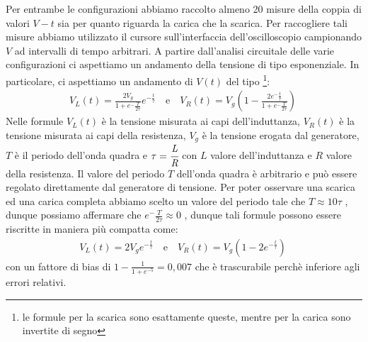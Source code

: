 \documentclass[a4paper]{article}
\begin{document}
Per entrambe le configurazioni abbiamo raccolto almeno 20 misure della coppia di valori \( \mathit{V-t} \) sia per quanto riguarda la carica che la scarica. Per raccogliere tali misure abbiamo utilizzato il cursore sull'interfaccia dell'oscilloscopio campionando \( \mathit{V} \) ad intervalli di tempo arbitrari.
A partire dall'analisi circuitale delle varie configurazioni ci aspettiamo un andamento della tensione di tipo esponenziale. In particolare, ci aspettiamo un andamento di  \( \mathit{V(t)} \) del tipo \footnote{le formule per la scarica sono esattamente queste, mentre per la carica sono invertite di segno}:
\begin{align}
	 & V_L(t) = \frac{2V_g}{1+e^-\frac{T}{\mathit{2\tau}}}e^{-\frac{t}{\mathit{\tau}}}  \quad \text{e} \quad V_R(t) = V_g\left(1-\frac{2e^-\frac{t}{\mathit{\tau}}}{1+e^-\frac{T}{\mathit{2\tau}}}\right)\quad \label{eq:rl_full} %
\end{align}
Nelle formule \( \mathit{V_L(t)} \) è la tensione misurata ai capi dell'induttanza, \( \mathit{V_R(t)} \)  è la tensione misurata ai capi della resistenza, \( \mathit{V_g} \) è la tensione erogata dal generatore, \( \mathit{T} \)  è il periodo dell'onda quadra e \( \mathit{\tau=\cfrac{L}{R}} \)  con \( \mathit{L} \) valore dell'induttanza e \( \mathit{R} \) valore della resistenza. Il valore del periodo \( \mathit{T} \) dell'onda quadra è arbitrario e può essere regolato direttamente dal generatore di tensione. Per poter osservare una scarica ed una carica completa abbiamo scelto un valore del periodo tale che \( \mathit{T\approx10\mathit{\tau}} \) , dunque possiamo affermare che \( \mathit{e^-\frac{T}{2\tau}}\approx 0 \) , dunque tali formule possono essere riscritte in maniera più compatta come: \begin{align}
	 & V_L(t) = 2V_ge^{-\frac{t}{\mathit{\tau}}}  \quad \text{e} \quad V_R(t) = V_g(1-2e^{-\frac{t}{\mathit{\tau}}})\quad \label{eq:rl_approx} %
\end{align}
con un fattore di bias di  $1-\frac{1}{1+e^{-5}}=0,007$ che è trascurabile perchè inferiore agli errori relativi.
\end{document}
